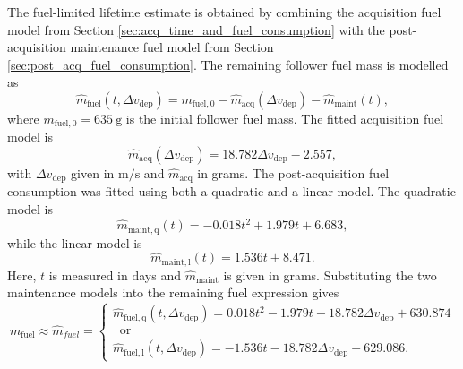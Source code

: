 The fuel-limited lifetime estimate is obtained by combining the acquisition fuel model from Section \ref{sec:acq_time_and_fuel_consumption} with the post-acquisition maintenance fuel model from Section \ref{sec:post_acq_fuel_consumption}. The remaining follower fuel mass is modelled as
\begin{equation}
\hat{m}_{\mathrm{fuel}}(t, \Delta v_{\mathrm{dep}})
=
m_{\mathrm{fuel},0}
-
\hat{m}_{\mathrm{acq}}(\Delta v_{\mathrm{dep}})
-
\hat{m}_{\mathrm{maint}}(t),
\end{equation}
where $m_{\mathrm{fuel},0}=635~\mathrm{g}$ is the initial follower fuel mass. The fitted acquisition fuel model is
\begin{equation}
\hat{m}_{\mathrm{acq}}(\Delta v_{\mathrm{dep}})
=
18.782\Delta v_{\mathrm{dep}} - 2.557,
\end{equation}
with $\Delta v_{\mathrm{dep}}$ given in $\mathrm{m/s}$ and $\hat{m}_{\mathrm{acq}}$ in grams. The post-acquisition fuel consumption was fitted using both a quadratic and a linear model. The quadratic model is
\begin{equation}
\hat{m}_{\mathrm{maint,q}}(t)
=
-0.018t^2
+
1.979t
+
6.683,
\end{equation}
while the linear model is
\begin{equation}
\hat{m}_{\mathrm{maint,l}}(t)
=
1.536t
+
8.471.
\end{equation}
Here, $t$ is measured in days and $\hat{m}_{\mathrm{maint}}$ is given in grams. Substituting the two maintenance models into the remaining fuel expression gives
\begin{equation}
    m_{\mathrm{fuel}} \approx \hat{m}_{fuel} = \begin{cases}
        \hat{m}_{\mathrm{fuel,q}}(t, \Delta v_{\mathrm{dep}}) = 0.018t^2 - 1.979t - 18.782\Delta v_{\mathrm{dep}} + 630.874 \\
        \;\; \text{or} \\
        \hat{m}_{\mathrm{fuel,l}}(t, \Delta v_{\mathrm{dep}}) = -1.536t - 18.782\Delta v_{\mathrm{dep}} + 629.086.
    \end{cases}
\end{equation}


